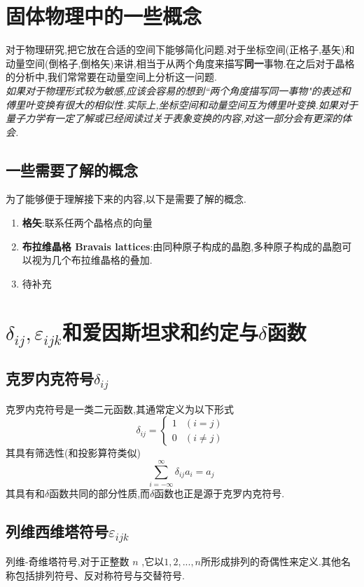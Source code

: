 \documentclass[lang=cn,newtx,10pt,scheme=chinese,thmcnt=section]{elegantbook}
\begin{document}
\chapter{固体物理中的一些概念}
对于物理研究,把它放在合适的空间下能够简化问题.对于坐标空间(正格子,基矢)和动量空间(倒格子,倒格矢)来讲,相当于从两个角度来描写\textbf{同一}事物.在之后对于晶格的分析中,我们常常要在动量空间上分析这一问题.\\
\textit{如果对于物理形式较为敏感,应该会容易的想到``两个角度描写同一事物"的表述和傅里叶变换有很大的相似性.实际上,坐标空间和动量空间互为傅里叶变换.如果对于量子力学有一定了解或已经阅读过关于表象变换的内容,对这一部分会有更深的体会.}
\section*{一些需要了解的概念}
为了能够便于理解接下来的内容,以下是需要了解的概念.
\begin{enumerate}
	\item \textbf{格矢}:联系任两个晶格点的向量
	\item \textbf{布拉维晶格 Bravais lattices}:由同种原子构成的晶胞,多种原子构成的晶胞可以视为几个布拉维晶格的叠加.
	\item 待补充
\end{enumerate}


\chapter{$\delta_{ij},\varepsilon_{ijk}$和爱因斯坦求和约定与$\delta$函数}
\section{克罗内克符号$\delta_{ij}$}
克罗内克符号是一类二元函数,其通常定义为以下形式
\begin{equation}
	 \delta _{ij}=\left\{{\begin{matrix}1&(i=j)\\0&(i\neq j)\end{matrix}}\right.\,\!
\end{equation}
其具有筛选性(和投影算符类似)
\begin{equation}
	\sum _{i=-\infty }^{\infty }\delta _{ij}a_{i}=a_{j}\,\!
\end{equation}
其具有和$\delta$函数共同的部分性质,而$\delta$函数也正是源于克罗内克符号.
\section{列维西维塔符号$\varepsilon_{ijk}$}
列维-奇维塔符号,对于正整数 $n$ ,它以$1, 2, ..., n $所形成排列的奇偶性来定义.其他名称包括排列符号、反对称符号与交替符号.
\end{document}
